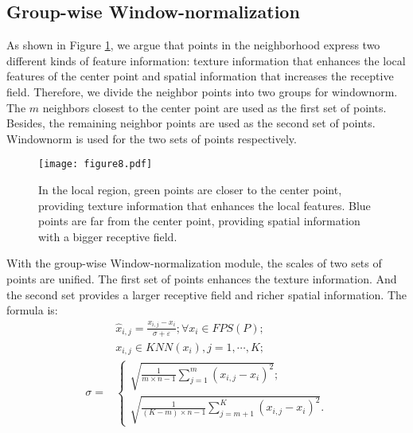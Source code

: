 \documentclass[10pt,twocolumn,letterpaper]{article}
\begin{document}
    \subsection{Group-wise Window-normalization}

        As shown in Figure \ref{fig:8}, we argue that points in the neighborhood express two different kinds of feature information: texture information that enhances the local features of the center point and spatial information that increases the receptive field. Therefore, we divide the neighbor points into two groups for windownorm. The $m$ neighbors closest to the center point are used as the first set of points. Besides, the remaining neighbor points are used as the second set of points. Windownorm is used for the two sets of points respectively.
        \begin{figure}[!htb]
        \centering
        \texttt{[image: figure8.pdf]}
        \caption{In the local region, green points are closer to the center point, providing texture information that enhances the local features. Blue points are far from the center point, providing spatial information with a bigger receptive field.}
        \label{fig:8}
        \end{figure}

        With the group-wise Window-normalization module, the scales of two sets of points are unified.
        The first set of points enhances the texture information.
        And the second set provides a larger receptive field and richer spatial information.
        The formula is:
\begin{equation}
            \begin{aligned}
        &{\hat x_{i,j}} = \frac{{{x_{i,j}} - {x_i}}}{{\sigma  + \varepsilon }};\forall {x_i} \in FPS\left( P \right);
        \\&{x_{i,j}} \in KNN\left( {{x_i}} \right),j = 1, \cdots ,K;\\
        \sigma = &\left\{ {\begin{array}{*{20}{c}}
        {\sqrt {\frac{1}{{m \times n - 1}}\mathop \sum \limits_{j = 1}^m {{\left( {{x_{i,j}} - {x_i}} \right)}^2}};}\\
        {\sqrt {\frac{1}{{\left( {K - m} \right) \times n - 1}}\mathop \sum \limits_{j = m + 1}^K {{\left( {{x_{i,j}} - {x_i}} \right)}^2}}.}
        \end{array}} \right.
            \end{aligned}
        \end{equation}
\end{document}
